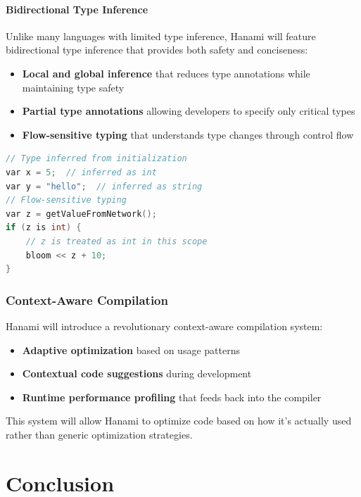 \documentclass[conference]{IEEEtran}
\begin{document}
\paragraph{Bidirectional Type Inference}
Unlike many languages with limited type inference, Hanami will feature bidirectional type inference that provides both safety and conciseness:
\begin{itemize}
\item \textbf{Local and global inference} that reduces type annotations while maintaining type safety
\item \textbf{Partial type annotations} allowing developers to specify only critical types
\item \textbf{Flow-sensitive typing} that understands type changes through control flow
\end{itemize}
\begin{lstlisting}[language=C++, caption={Planned type inference example}, label={lst:planned_type_inference}, basicstyle=\ttfamily\scriptsize, columns=flexible]
// Type inferred from initialization
var x = 5;  // inferred as int
var y = "hello";  // inferred as string
// Flow-sensitive typing
var z = getValueFromNetwork();
if (z is int) {
    // z is treated as int in this scope
    bloom << z + 10;
}
\end{lstlisting}
\subsubsection{Context-Aware Compilation}
Hanami will introduce a revolutionary context-aware compilation system:
\begin{itemize}
\item \textbf{Adaptive optimization} based on usage patterns
\item \textbf{Contextual code suggestions} during development
\item \textbf{Runtime performance profiling} that feeds back into the compiler
\end{itemize}
This system will allow Hanami to optimize code based on how it's actually used rather than generic optimization strategies.

\section{Conclusion} %
\label{sec:conclusion}
\end{document}
